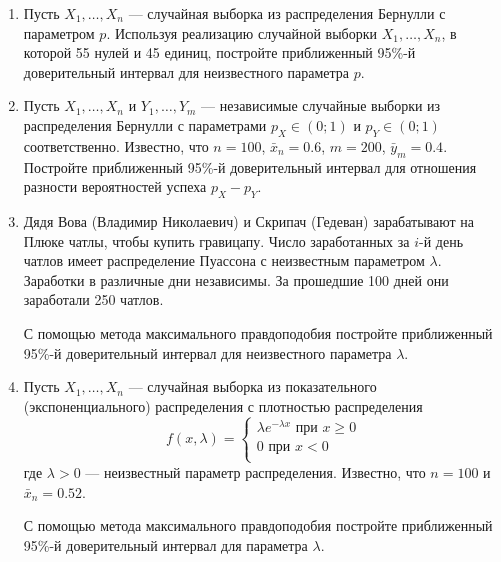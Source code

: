 \begin{enumerate}
\item Пусть $X_{1}, \ldots, X_{n}$ — случайная выборка из распределения Бернулли
с параметром $p$.
Используя реализацию случайной выборки $X_{1}, \ldots, X_{n}$,
в которой 55 нулей и 45 единиц,
постройте приближенный 95\%-й доверительный интервал для неизвестного параметра $p$.

\item Пусть $X_{1}, \ldots, X_{n}$ и $Y_{1}, \ldots, Y_{m}$ — независимые случайные
выборки из распределения Бернулли с параметрами $p_{X} \in (0;1)$ и $p_{Y} \in (0;1)$ соответственно.
Известно, что $n = 100$, $\bar{x}_{n} = 0.6$, $m = 200$, $\bar{y}_{m} = 0.4$.
Постройте приближенный 95\%-й доверительный интервал для отношения разности
вероятностей успеха $p_{X} - p_{Y}$.

\item Дядя Вова (Владимир Николаевич) и Скрипач (Гедеван) зарабатывают на Плюке чатлы,
чтобы купить гравицапу.
Число заработанных за $i$-й день чатлов имеет распределение Пуассона с неизвестным параметром $\lambda$.
Заработки в различные дни независимы. За прошедшие 100 дней они заработали 250 чатлов.

С помощью метода максимального правдоподобия постройте приближенный
95\%-й доверительный интервал для неизвестного параметра $\lambda$.

\item Пусть $X_{1}, \ldots, X_{n}$ — случайная выборка из показательного
(экспоненциального) распределения с плотностью распределения
\[
f(x,\lambda)=
\begin{cases}
\lambda e^{-\lambda x}\text{ при } x\geq 0 \\
0 \text{ при } x < 0 \\
\end{cases}
\]
где $\lambda > 0$ — неизвестный параметр распределения.
Известно, что $n = 100$ и $\bar{x}_n = 0.52$.

С помощью метода максимального правдоподобия постройте приближенный
95\%-й доверительный интервал для параметра $\lambda$.





\end{enumerate}
